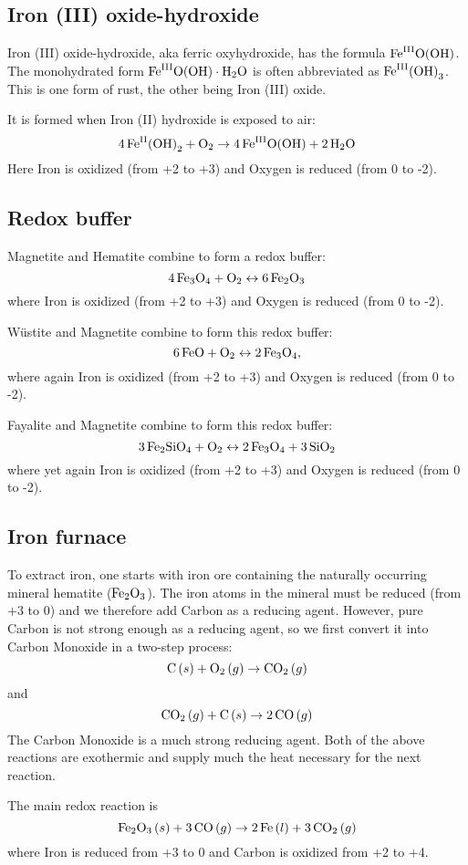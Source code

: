 \documentclass[a4paper,14pt]{extarticle}
\def\H{{\rm H}}
\def\O{{\rm O}}
\def\C{{\rm C}}
\def\Fe{{\rm Fe}}
\def\Si{{\rm Si}}
\def\II{{\rm II}}
\def\III{{\rm III}}
\begin{document}
\subsection{Iron (III) oxide-hydroxide}
Iron (III) oxide-hydroxide, aka ferric oxyhydroxide, has the formula $\Fe^\III\O(\O\H)$. The monohydrated form
$\Fe^\III\O(\O\H)\cdot \H_2\O$ is often abbreviated as $\Fe^\III{(\O\H)}_3$. This is one form of rust, the other being
Iron (III) oxide.

It is formed when Iron (II) hydroxide is exposed to air:
\[
    4 \,\Fe^\II{(\O\H)}_2 + \O_2 \rightarrow 4 \,\Fe^\III\O(\O\H) + 2 \,\H_2\O
\]
Here Iron is oxidized (from +2 to +3) and Oxygen is reduced (from 0 to -2).

\subsection{Redox buffer}
Magnetite and Hematite combine to form a redox buffer:
\[
    4 \,\Fe_3\O_4 + \O_2 \leftrightarrow 6\, \Fe_2\O_3
\]
where Iron is oxidized (from +2 to +3) and Oxygen is reduced (from 0 to -2).

Wüstite and Magnetite combine to form this redox buffer:
\[
    6 \,\Fe\O + \O_2 \leftrightarrow 2\,\Fe_3\O_4,
\]
where again Iron is oxidized (from +2 to +3) and Oxygen is reduced (from 0 to -2).

Fayalite and Magnetite combine to form this redox buffer:
\[
    3 \,\Fe_2\Si\O_4 + \O_2 \leftrightarrow 2 \,\Fe_3\O_4 + 3 \,\Si\O_2
\]
where yet again Iron is oxidized (from +2 to +3) and Oxygen is reduced (from 0 to -2).

\subsection{Iron furnace}
To extract iron, one starts with iron ore containing the naturally occurring mineral hematite ($\Fe_2\O_3$). The iron
atoms in the mineral must be reduced (from +3 to 0) and we therefore add Carbon as a reducing agent. However, pure Carbon is not
strong enough as a reducing agent, so we first convert it into Carbon Monoxide in a two-step process:
\[
    \C\,(s) + \O_2\,(g) \rightarrow \C\O_2\,(g)
\]
and
\[
    \C\O_2\,(g) + \C\,(s) \rightarrow 2\,\C\O\,(g)
\]
The Carbon Monoxide is a much strong reducing agent. Both of the above reactions are exothermic and supply much the heat
necessary for the next reaction.

The main redox reaction is
\[
    \Fe_2\O_3\,(s) + 3\,\C\O\,(g) \rightarrow 2\,\Fe\,(l) + 3\,\C\O_2\,(g)
\]
where Iron is reduced from +3 to 0 and Carbon is oxidized from +2 to +4.
\end{document}
